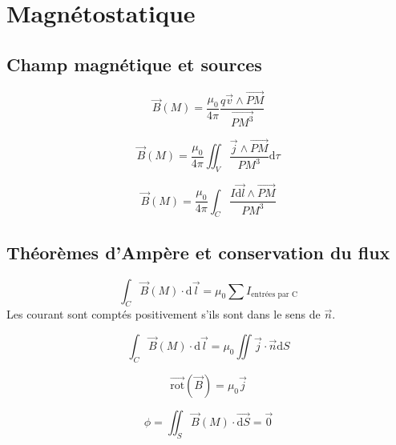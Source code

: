 \documentclass[french]{yLectureNote}
\renewcommand{\vec}{\overrightarrow}
\renewcommand{\vec}{\overrightarrow}
\newcommand{\dd}[0]{\mathrm{d}}
\newcommand{\B}{\vec{B}(M)}
\newcommand{\rot}{\vec{\mathrm{rot}}}
\begin{document}
\section{Magnétostatique}

\subsection{Champ magnétique et sources}

\begin{theorem}
$$\B = \frac{\mu_0}{4\pi}\frac{q\vec{v}\wedge \vec{PM}}{\vec{PM^3}}$$

\end{theorem}

\begin{theorem}
    $$\B = \frac{\mu_0}{4\pi}\iint_V \frac{\vec{j}\wedge \vec{PM}}{PM^3}\dd \tau$$

\end{theorem}

\begin{theorem}
            $$\B = \frac{\mu_0}{4\pi}\int_C \frac{I\vec{\dd l}\wedge \vec{PM}}{PM^3}$$

\end{theorem}

\subsection{Théorèmes d'Ampère et conservation du flux}

\begin{theorem}
\[\int_C \vec{B}(M)\cdot \dd \vec{l} = \mu_0 \sum I_{\text{entrées par C}} \]
Les courant sont comptés positivement s'ils sont dans le sens de \(\vec{n}\).

\end{theorem}

\begin{theorem}
 \[\int_C\B\cdot \dd \vec{l} = \mu_0 \iint \vec{j}\cdot \vec{n}\dd S\]

\end{theorem}

\begin{theorem}
\[\rot(\vec{B})=\mu_0 \vec{j}\]

\end{theorem}

\begin{theorem}

    $$\phi = \iint_S \B\cdot \vec{\dd S} = \vec{0}$$

\end{theorem}
\end{document}
